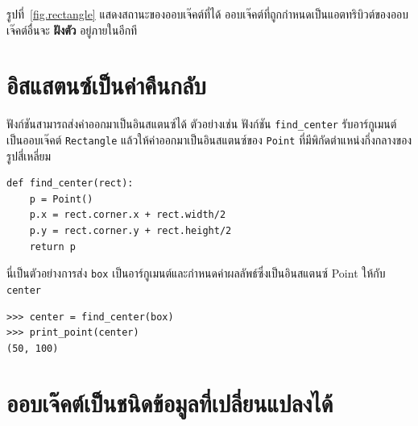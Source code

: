 
รูปที่~\ref{fig.rectangle} แสดงสถานะของออบเจ๊คต์ที่ได้ ออบเจ๊คต์ที่ถูกกำหนดเป็นแอตทริบิวต์ของออบเจ๊คต์อื่นจะ {\bf ฝังตัว} อยู่ภายในอีกที



\section{อิสแสตนซ์เป็นค่าคืนกลับ} %


ฟังก์ชันสามารถส่งค่าออกมาเป็นอินสแตนซ์ได้ ตัวอย่างเช่น ฟังก์ชัน \verb"find_center" รับอาร์กูเมนต์เป็นออบเจ๊คต์ {\tt Rectangle} 
แล้วให้ค่าออกมาเป็นอินสแตนซ์ของ {\tt Point} ที่มีพิกัดตำแหน่งกึ่งกลางของรูปสี่เหลี่ยม

\begin{verbatim}
def find_center(rect):
    p = Point()
    p.x = rect.corner.x + rect.width/2
    p.y = rect.corner.y + rect.height/2
    return p
\end{verbatim}
%

นี่เป็นตัวอย่างการส่ง {\tt box} เป็นอาร์กูเมนต์และกำหนดค่าผลลัพธ์ซึ่งเป็นอินสแตนซ์ Point ให้กับ {\tt center}

\begin{verbatim}
>>> center = find_center(box)
>>> print_point(center)
(50, 100)
\end{verbatim}
%

\section{ออบเจ๊คต์เป็นชนิดข้อมูลที่เปลี่ยนแปลงได้} %

